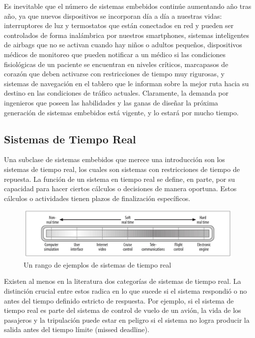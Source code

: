 \documentclass[output=paper, 
colorlinks,
citecolor=brown,
newtxmath
]{langscibook}
\begin{document}
Es inevitable que el número de sistemas embebidos continúe aumentando año tras año,
ya que nuevos dispositivos se incorporan día a día a nuestras vidas: interruptores de luz y termostatos 
que están conectados en red y pueden ser controlados de forma inalámbrica por nuestros smartphones,
sistemas inteligentes de airbags que no se activan cuando hay niños o adultos pequeños, 
dispositivos médicos de monitoreo que pueden notificar a un médico si las condiciones 
fisiológicas de un paciente se encuentran en niveles críticos, marcapasos de corazón que deben
activarse con restricciones de tiempo muy rigurosas, y sistemas de navegación 
en el tablero que le informan sobre la mejor ruta hacia su destino en las condiciones de 
tráfico actuales. 
Claramente, la demanda por ingenieros que poseen las habilidades y las ganas de diseñar 
la próxima generación de sistemas embebidos está vigente, y lo estará por mucho tiempo.




\subsection {Sistemas de Tiempo Real} 



Una subclase de sistemas embebidos que merece una introducción son los sistemas de tiempo real,
los cuales son sistemas con restricciones de tiempo de repuesta.
La función de un sistema en tiempo real se define, en parte, por su capacidad para hacer
ciertos cálculos o decisiones de manera oportuna. Estos cálculos o actividades 
tienen plazos de finalización específicos.


\begin{figure}
\includegraphics[scale=0.25]{images/real-time-system.jpg}
\caption{Un rango de ejemplos de sistemas de tiempo real}
\label{fig:sist-tiemp-real}
\end{figure}


Existen al menos en la literatura dos categorías de sistemas de tiempo real.
La distinción crucial entre estos radica en lo que sucede si el sistema respondió o no antes
del tiempo definido estricto de respuesta.
Por ejemplo, si el sistema de tiempo real es parte del sistema de control de vuelo de un avión, 
la vida de los pasajeros y la tripulación puede estar en peligro si el sistema no logra
producir la salida antes del tiempo límite (missed deadline).
\end{document}
